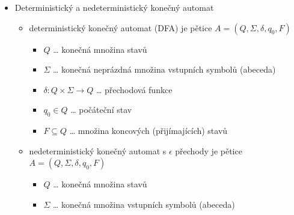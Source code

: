 \begin{itemize}
\begin{itemize}
\begin{itemize}
\begin{itemize}
\item pro regulární $L$ musí existovat pravá kongruence konečného indexu $m$
\item mějme množinu řetězců $S=\set{ab,abb,abbb,\dots,ab^{m+1}}$
\item $|S|=m+1$, tedy nutně existují dvě slova $i\neq j$, která padnou do stejné třídy
\begin{itemize}
\item $ab^i\sim ab^j$
\item tedy $ab^ic^i\sim ab^jc^i$
\item ale $ab^ic^i\in L$ a $ab^jc^i\notin L$, což je spor, takže jazyk není regulární
\end{itemize}
\end{itemize}
\end{itemize}
\item věta: jazyk $L$ je rozpoznatelný $\epsilon$NFA, právě když je $L$ regulární
\begin{itemize}
\item pro libovolný $\epsilon$NFA $N$ zkonstruujeme DFA $D$ přijímající stejný jazyk jako $N$
\item nové stavy jsou $\epsilon$-uzavřené podmnožiny $Q_N$
\end{itemize}
\end{itemize}
\item Deterministický a nedeterministický konečný automat
\begin{itemize}
\item deterministický konečný automat (DFA) je pětice $A=(Q,\Sigma,\delta,q_0,F)$
\begin{itemize}
\item $Q$ \dots{} konečná množina stavů
\item $\Sigma$ \dots{} konečná neprázdná množina vstupních symbolů (abeceda)
\item $\delta:Q\times\Sigma\to Q$ \dots{} přechodová funkce
\item $q_0\in Q$ \dots{} počáteční stav
\item $F\subseteq Q$ \dots{} množina koncových (přijímajících) stavů
\end{itemize}
\item nedeterministický konečný automat s $\epsilon$ přechody je pětice $A=(Q,\Sigma,\delta,q_0,F)$
\begin{itemize}
\item $Q$ \dots{} konečná množina stavů
\item $\Sigma$ \dots{} konečná množina vstupních symbolů (abeceda)

\end{itemize}
\end{itemize}
\end{itemize}
